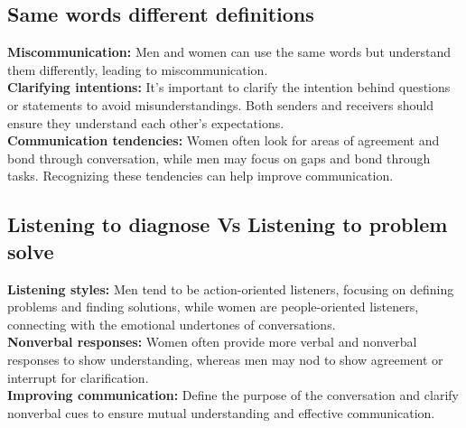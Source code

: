 \documentclass[12pt]{article}
\begin{document}
\subsection{Same words different definitions}
\textbf{Miscommunication:}  Men and women can use the same words but understand them differently, leading to miscommunication.\\
\textbf{Clarifying intentions:}  It's important to clarify the intention behind questions or statements to avoid misunderstandings. Both senders and receivers should ensure they understand each other's expectations.\\
\textbf{Communication tendencies:}  Women often look for areas of agreement and bond through conversation, while men may focus on gaps and bond through tasks. Recognizing these tendencies can help improve communication.

\subsection{Listening to diagnose Vs Listening to problem solve}
\textbf{Listening styles:}  Men tend to be action-oriented listeners, focusing on defining problems and finding solutions, while women are people-oriented listeners, connecting with the emotional undertones of conversations.\\
\textbf{Nonverbal responses:}  Women often provide more verbal and nonverbal responses to show understanding, whereas men may nod to show agreement or interrupt for clarification.\\
\textbf{Improving communication:}  Define the purpose of the conversation and clarify nonverbal cues to ensure mutual understanding and effective communication.

\end{document}
